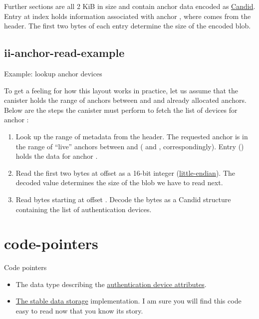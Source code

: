 \documentclass{article}
\begin{document}
Further sections are all 2 KiB in size and contain anchor data encoded as \href{https://github.com/dfinity/candid}{Candid}.
Entry at index  holds information associated with anchor , where  comes from the header.
The first two bytes of each entry determine the size of the encoded blob.

\subsection{ii-anchor-read-example}{Example: lookup anchor devices}

To get a feeling for how this layout works in practice, let us assume that the canister holds the range of anchors between  and  and already allocated  anchors.
Below are the steps the canister must perform to fetch the list of devices for anchor :
\begin{enumerate}
  \item 
    Look up the range of metadata from the header.
    The requested anchor  is in the range of ``live'' anchors between  and  ( and , correspondingly).
    Entry  () holds the data for anchor .
  \item 
    Read the first two bytes at offset  as a 16-bit integer (\href{https://en.wikipedia.org/wiki/Endianness}{little-endian}).
    The decoded value  determines the size of the blob we have to read next.
  \item 
    Read  bytes starting at offset .
    Decode the bytes as a Candid structure containing the list of authentication devices.
\end{enumerate}

\section{code-pointers}{Code pointers}
\begin{itemize}
  \item
    The data type describing the \href{https://github.com/dfinity/internet-identity/blob/62afdcbd74b1de1d9ab41c9f856e2319661a32cf/src/internet_identity/src/state.rs#L20-L31}{authentication device attributes}.
  \item 
    \href{https://github.com/dfinity/internet-identity/blob/62afdcbd74b1de1d9ab41c9f856e2319661a32cf/src/internet_identity/src/storage.rs}{The stable data storage} implementation.
    I am sure you will find this code easy to read now that you know its story.
\end{itemize}
\end{document}
